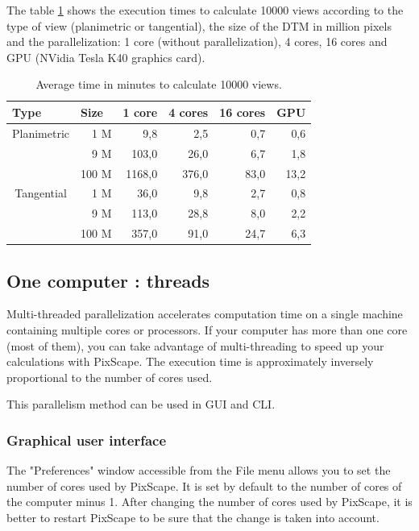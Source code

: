 \documentclass{report}
\begin{document}
The table \ref{perf_table} shows the execution times to calculate 10000 views according to the type of view (planimetric or tangential), the size of the DTM in million pixels and the parallelization: 1 core (without parallelization), 4 cores, 16 cores and GPU (NVidia Tesla K40 graphics card).

\begin{table}[htbp]
	
	\begin{tabular}{|l|r|r|r|r|r|}
		\hline
		Type & \multicolumn{1}{l|}{Size} & \multicolumn{1}{l|}{1 core} & \multicolumn{1}{l|}{4 cores} & \multicolumn{1}{l|}{16 cores} & \multicolumn{1}{l|}{GPU} \\ \hline
		\multicolumn{ 1}{|c|}{Planimetric} & 1 M & 9,8 & 2,5 & 0,7 & 0,6 \\ \cline{ 2- 6}
		\multicolumn{ 1}{|l|}{} & 9 M & 103,0 & 26,0 & 6,7 & 1,8 \\ \cline{ 2- 6}
		\multicolumn{ 1}{|l|}{} & 100 M & 1168,0 & 376,0 & 83,0 & 13,2 \\ \hline
		\multicolumn{ 1}{|c|}{Tangential} & 1 M & 36,0 & 9,8 & 2,7 & 0,8 \\ \cline{ 2- 6}
		\multicolumn{ 1}{|l|}{} & 9 M & 113,0 & 28,8 & 8,0 & 2,2 \\ \cline{ 2- 6}
		\multicolumn{ 1}{|l|}{} & 100 M & 357,0 & 91,0 & 24,7 & 6,3 \\ \hline
	\end{tabular}
	\caption{Average time in minutes to calculate 10000 views.}
	\label{perf_table}
\end{table}


\subsection{One computer : threads}
\label{thread}
Multi-threaded parallelization accelerates computation time on a single machine containing multiple cores or processors. If your computer has more than one core (most of them), you can take advantage of multi-threading to speed up your calculations with PixScape. The execution time is approximately inversely proportional to the number of cores used. 

This parallelism method can be used in GUI and CLI.

\subsubsection{Graphical user interface}
The "Preferences" window accessible from the File menu allows you to set the number of cores used by PixScape. It is set by default to the number of cores of the computer minus 1. After changing the number of cores used by PixScape, it is better to restart PixScape to be sure that the change is taken into account.
\end{document}
